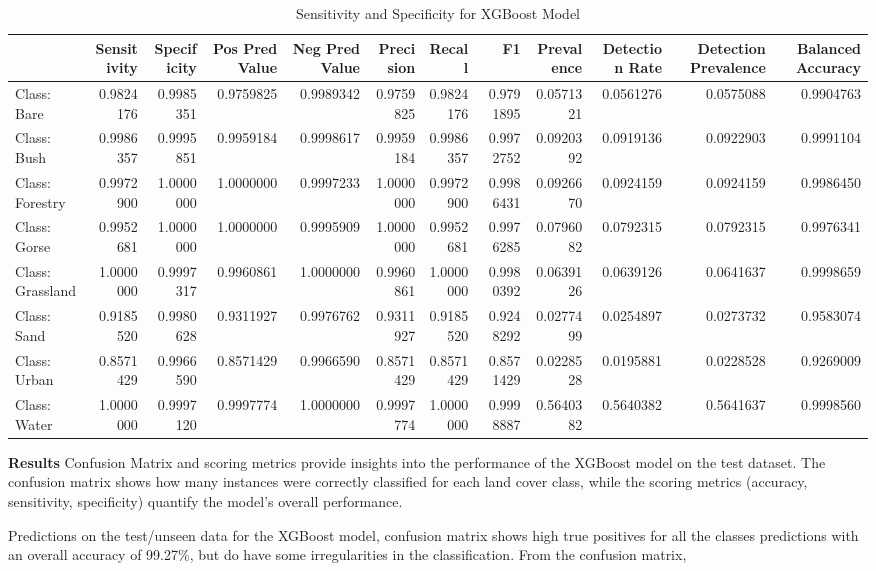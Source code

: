 \documentclass[
]{article}
\begin{document}
\begin{longtable}[l]{lrrrrrrrrrrr}
\caption{\label{tab:xgb_confusion_matrix}Sensitivity and Specificity for XGBoost Model}\\
\toprule
 & Sensitivity & Specificity & Pos Pred Value & Neg Pred Value & Precision & Recall & F1 & Prevalence & Detection Rate & Detection Prevalence & Balanced Accuracy\\
\midrule
Class: Bare & 0.9824176 & 0.9985351 & 0.9759825 & 0.9989342 & 0.9759825 & 0.9824176 & 0.9791895 & 0.0571321 & 0.0561276 & 0.0575088 & 0.9904763\\
Class: Bush & 0.9986357 & 0.9995851 & 0.9959184 & 0.9998617 & 0.9959184 & 0.9986357 & 0.9972752 & 0.0920392 & 0.0919136 & 0.0922903 & 0.9991104\\
Class: Forestry & 0.9972900 & 1.0000000 & 1.0000000 & 0.9997233 & 1.0000000 & 0.9972900 & 0.9986431 & 0.0926670 & 0.0924159 & 0.0924159 & 0.9986450\\
Class: Gorse & 0.9952681 & 1.0000000 & 1.0000000 & 0.9995909 & 1.0000000 & 0.9952681 & 0.9976285 & 0.0796082 & 0.0792315 & 0.0792315 & 0.9976341\\
Class: Grassland & 1.0000000 & 0.9997317 & 0.9960861 & 1.0000000 & 0.9960861 & 1.0000000 & 0.9980392 & 0.0639126 & 0.0639126 & 0.0641637 & 0.9998659\\
\addlinespace
Class: Sand & 0.9185520 & 0.9980628 & 0.9311927 & 0.9976762 & 0.9311927 & 0.9185520 & 0.9248292 & 0.0277499 & 0.0254897 & 0.0273732 & 0.9583074\\
Class: Urban & 0.8571429 & 0.9966590 & 0.8571429 & 0.9966590 & 0.8571429 & 0.8571429 & 0.8571429 & 0.0228528 & 0.0195881 & 0.0228528 & 0.9269009\\
Class: Water & 1.0000000 & 0.9997120 & 0.9997774 & 1.0000000 & 0.9997774 & 1.0000000 & 0.9998887 & 0.5640382 & 0.5640382 & 0.5641637 & 0.9998560\\
\bottomrule
\end{longtable}

\textbf{Results} Confusion Matrix and scoring metrics provide insights
into the performance of the XGBoost model on the test dataset. The
confusion matrix shows how many instances were correctly classified for
each land cover class, while the scoring metrics (accuracy, sensitivity,
specificity) quantify the model's overall performance.

Predictions on the test/unseen data for the XGBoost model, confusion
matrix shows high true positives for all the classes predictions with an
overall accuracy of 99.27\%, but do have some irregularities in the
classification. From the confusion matrix,
\end{document}
